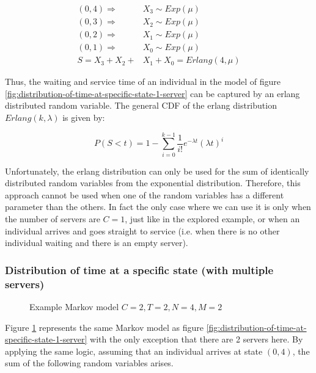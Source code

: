 \begin{align}
    (0,4) \Rightarrow \quad & X_3 \sim Exp(\mu) \nonumber \\
    (0,3) \Rightarrow \quad & X_2 \sim Exp(\mu) \nonumber \\
    (0,2) \Rightarrow \quad & X_1 \sim Exp(\mu) \nonumber \\
    (0,1) \Rightarrow \quad & X_0 \sim Exp(\mu) \nonumber \\
    S = X_3 + X_2 + & X_1 + X_0 = Erlang(4, \mu)
\end{align}

Thus, the waiting and service time of an individual in the model of figure 
\ref{fig:distribution-of-time-at-specific-state-1-server} can be captured by an 
erlang distributed random variable. 
The general CDF of the erlang distribution \(Erlang(k, \lambda)\) is given by:

\begin{equation} \label{eq:cdf-erlang}
    P(S < t) = 1 - \sum_{i=0}^{k-1} \frac{1}{i!} e^{-\lambda t} (\lambda t)^i
\end{equation}

Unfortunately, the erlang distribution can only be used for the sum of 
identically distributed random variables from the exponential distribution. 
Therefore, this approach cannot be used when one of the random variables has a 
different parameter than the others. 
In fact the only case where we can use it is only when the number of servers are
\(C=1\), just like in the explored example, or when an individual arrives and 
goes straight to service (i.e. when there is no other individual waiting and 
there is an empty server).


\subsubsection{Distribution of time at a specific state (with multiple servers)}

\begin{figure}[h]
    \centering
    \scalebox{0.75}{}
    \caption{Example Markov model \(C=2, T=2, N=4, M=2\)}
    \label{fig:distribution-of-time-at-specific-state-2-servers}
\end{figure}

Figure \ref{fig:distribution-of-time-at-specific-state-2-servers} represents the 
same Markov model as figure 
\ref{fig:distribution-of-time-at-specific-state-1-server} with the only 
exception that there are 2 servers here. 
By applying the same logic, assuming that an individual arrives at state 
\((0,4)\), the sum of the following random variables arises.

